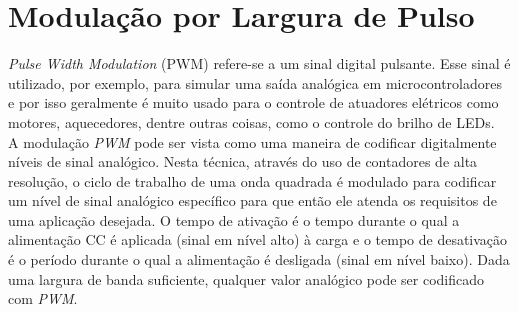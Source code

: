 \section{Modulação por Largura de Pulso}
\label{sec:PWM}

\emph{Pulse Width Modulation} (PWM) refere-se a um sinal digital pulsante. Esse sinal é utilizado, por exemplo, para simular uma saída analógica em microcontroladores e por isso geralmente é muito usado para o controle de atuadores elétricos como motores, aquecedores, dentre outras coisas, como o controle do brilho de LEDs. \\

A modulação \emph{PWM} pode ser vista como uma maneira de codificar digitalmente níveis de sinal analógico. Nesta técnica, através do uso de contadores de alta resolução, o ciclo de trabalho de uma onda quadrada é modulado para codificar um nível de sinal analógico específico para que então ele atenda os requisitos de uma aplicação desejada. O tempo de ativação é o tempo durante o qual a alimentação CC é aplicada (sinal em nível alto) à carga e o tempo de desativação é o período durante o qual a alimentação é desligada (sinal em nível baixo). Dada uma largura de banda suficiente, qualquer valor analógico pode ser codificado com \emph{PWM}.